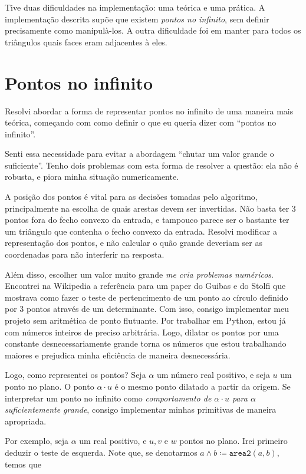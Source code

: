 \documentclass[10pt,reqno,a4paper]{article}
\begin{document}
Tive duas dificuldades na implementação: uma teórica e uma prática. A
implementação descrita supõe que existem \emph{pontos no infinito}, sem
definir precisamente como manipulà-los. A outra dificuldade foi em manter
para todos os triângulos quais faces eram adjacentes à eles.

\section{Pontos no infinito}

Resolvi abordar a forma de representar pontos no infinito de uma maneira
mais teórica, começando com como definir o que eu queria dizer com
``pontos no infinito''.

Senti essa necessidade para evitar a abordagem ``chutar um valor grande o
suficiente''. Tenho dois problemas com esta forma de resolver a questão:
ela não é robusta, e piora minha situação numericamente.

A posição dos pontos é vital para as decisões tomadas pelo algoritmo,
principalmente na escolha de quais arestas devem ser invertidas. Não basta
ter 3 pontos fora do fecho convexo da entrada, e tampouco parece ser o
bastante ter um triângulo que contenha o fecho convexo da entrada.
Resolvi modificar a representação dos pontos, e não calcular o quão grande
deveriam ser as coordenadas para não interferir na resposta.

Além disso, escolher um valor muito grande \emph{me cria problemas numéricos}.
Encontrei na Wikipedia a referência para um paper do Guibas e do Stolfi que
mostrava como fazer o teste de pertencimento de um ponto ao círculo definido por
3 pontos através de um determinante. Com isso, consigo implementar meu projeto
sem aritmética de ponto flutuante. Por trabalhar em Python, estou já com
números inteiros de preciso arbitrária. Logo, dilatar os pontos por uma
constante desnecessariamente grande torna os números que estou trabalhando
maiores e prejudica minha eficiência de maneira desnecessária.

Logo, como representei os pontos? Seja $\alpha$ um número real positivo,
e seja $u$ um ponto no plano. O ponto $\alpha \cdot u$ é o mesmo ponto dilatado
a partir da origem. Se interpretar um ponto no infinito como \emph{comportamento
de $\alpha \cdot u$ para $\alpha$ suficientemente grande}, consigo implementar
minhas primitivas de maneira apropriada.

Por exemplo, seja $\alpha$ um real positivo, e $u, v$ e $w$ pontos no plano.
Irei primeiro deduzir o teste de esquerda. Note que, se denotarmos
$a \wedge b \coloneqq \texttt{area2}(a, b)$, temos que
\end{document}
